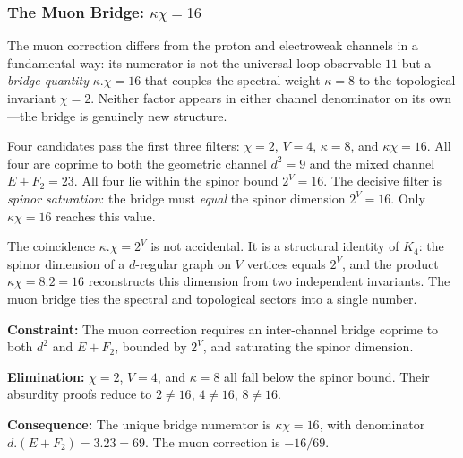 \documentclass[11pt,a4paper]{book}
\def\cdot{.}%
\begin{document}
\subsubsection*{The Muon Bridge: $\kappa \chi = 16$}

The muon correction differs from the proton and electroweak channels in
a fundamental way: its numerator is not the universal loop observable $11$
but a \emph{bridge quantity} $\kappa \cdot \chi = 16$ that couples the
spectral weight $\kappa = 8$ to the topological invariant $\chi = 2$.
Neither factor appears in either channel denominator on its own---the
bridge is genuinely new structure.

Four candidates pass the first three filters:
$\chi = 2$, $V = 4$, $\kappa = 8$, and $\kappa \chi = 16$.
All four are coprime to both the geometric channel $d^2 = 9$
and the mixed channel $E + F_2 = 23$.  All four lie within the
spinor bound $2^V = 16$.  The decisive filter is \emph{spinor
saturation}: the bridge must \emph{equal} the spinor dimension
$2^V = 16$.  Only $\kappa \chi = 16$ reaches this value.

The coincidence $\kappa \cdot \chi = 2^V$ is not accidental.
It is a structural identity of $K_4$: the spinor dimension of a
$d$-regular graph on $V$ vertices equals $2^V$, and the product
$\kappa \chi = 8 \cdot 2 = 16$ reconstructs this dimension from
two independent invariants.  The muon bridge ties the spectral and
topological sectors into a single number.

\textbf{Constraint:}
The muon correction requires an inter-channel bridge coprime to
both $d^2$ and $E + F_2$, bounded by $2^V$, and saturating the
spinor dimension.

\textbf{Elimination:}
$\chi = 2$, $V = 4$, and $\kappa = 8$ all fall below the spinor
bound.  Their absurdity proofs reduce to $2 \neq 16$, $4 \neq 16$,
$8 \neq 16$.

\textbf{Consequence:}
The unique bridge numerator is $\kappa \chi = 16$, with denominator
$d \cdot (E + F_2) = 3 \cdot 23 = 69$.  The muon correction is
$-16/69$.
\end{document}
